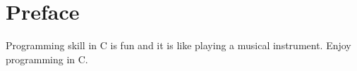 \chapter{Preface}

Programming skill in C is fun and it is like playing a musical instrument. Enjoy programming in C.

